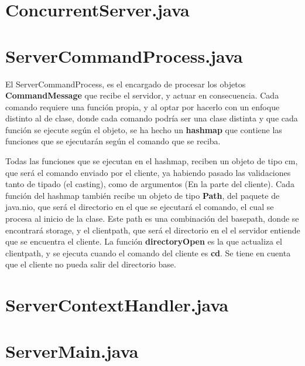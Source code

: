 \documentclass[a4paper, 12pt]{report}
\begin{document}
    \section{ConcurrentServer.java}
    \section{ServerCommandProcess.java}
    El ServerCommandProcess, es el encargado de procesar los objetos \textbf{CommandMessage} que recibe el
    servidor, y actuar en consecuencia. Cada comando requiere una función propia, y al optar
    por hacerlo con un enfoque distinto al de clase, donde cada comando podría ser una clase distinta y que cada
    función se ejecute según el objeto, se ha hecho un \textbf{hashmap} que contiene las funciones que se ejecutarán
    según el comando que se reciba.

    Todas las funciones que se ejecutan en el hashmap, reciben un objeto de tipo cm,
    que será el comando enviado por el cliente, ya habiendo pasado las validaciones tanto de tipado (el casting),
    como de argumentos (En la parte del cliente). Cada función del hashmap también recibe un objeto de tipo
    \textbf{Path}, del paquete de java.nio, que será el directorio en el que se ejecutará el comando, el cual se
    procesa al inicio de la clase. Este path es una combinación del basepath, donde se encontrará storage, y el
    clientpath, que será el directorio en el el servidor entiende que se encuentra el cliente. La función
    \textbf{directoryOpen} es la que actualiza el clientpath, y se ejecuta cuando el comando del cliente es
    \textbf{cd}. Se tiene en cuenta que el cliente no pueda salir del directorio base.

    \section{ServerContextHandler.java}
    \section{ServerMain.java}
\end{document}
